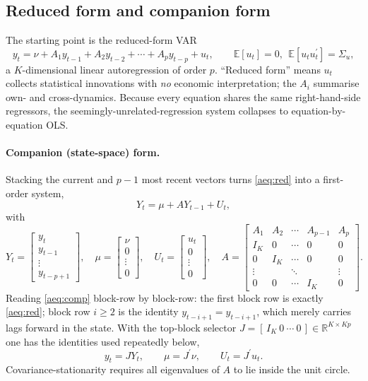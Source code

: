 \documentclass[11pt]{article}
\newcommand{\E}{\mathbb{E}}
\newcommand{\R}{\mathbb{R}}
\newcommand{\tp}{^{\prime}}
\theoremstyle{remark}
\begin{document}
\subsection{Reduced form and companion form}\label{app:redcomp}
The starting point is the reduced-form VAR
\begin{equation}
y_t=\nu+A_1y_{t-1}+A_2y_{t-2}+\cdots+A_py_{t-p}+u_t,
\qquad \E[u_t]=0,\ \ \E[u_tu_t\tp]=\Sigma_u,
\tag{1}\label{aeq:red}
\end{equation}
a $K$-dimensional linear autoregression of order $p$. ``Reduced form'' means
$u_t$ collects statistical innovations with \emph{no} economic interpretation;
the $A_i$ summarise own- and cross-dynamics. Because every equation shares the
same right-hand-side regressors, the seemingly-unrelated-regression system
collapses to equation-by-equation OLS.

\paragraph{Companion (state-space) form.} Stacking the current and $p-1$ most
recent vectors turns \eqref{aeq:red} into a first-order system,
\begin{equation}
Y_t=\mu+AY_{t-1}+U_t,
\tag{2}\label{aeq:comp}
\end{equation}
with
\[
Y_t=\begin{bmatrix} y_t\\ y_{t-1}\\ \vdots\\ y_{t-p+1}\end{bmatrix},\quad
\mu=\begin{bmatrix}\nu\\0\\\vdots\\0\end{bmatrix},\quad
U_t=\begin{bmatrix}u_t\\0\\\vdots\\0\end{bmatrix},\quad
A=\begin{bmatrix}
A_1 & A_2 & \cdots & A_{p-1} & A_p\\
I_K & 0 & \cdots & 0 & 0\\
0 & I_K & \cdots & 0 & 0\\
\vdots & & \ddots & & \vdots\\
0 & 0 & \cdots & I_K & 0
\end{bmatrix}.
\]
Reading \eqref{aeq:comp} block-row by block-row: the first block row is exactly
\eqref{aeq:red}; block row $i\ge2$ is the identity $y_{t-i+1}=y_{t-i+1}$, which
merely carries lags forward in the state. With the top-block selector
$J=[\,I_K\ 0\ \cdots\ 0\,]\in\R^{K\times Kp}$ one has the identities used
repeatedly below,
\begin{equation}
y_t=JY_t,\qquad \mu=J\tp\nu,\qquad U_t=J\tp u_t.
\tag{$\star$}\label{aeq:star}
\end{equation}
Covariance-stationarity requires all eigenvalues of $A$ to lie inside the unit
circle.
\end{document}
